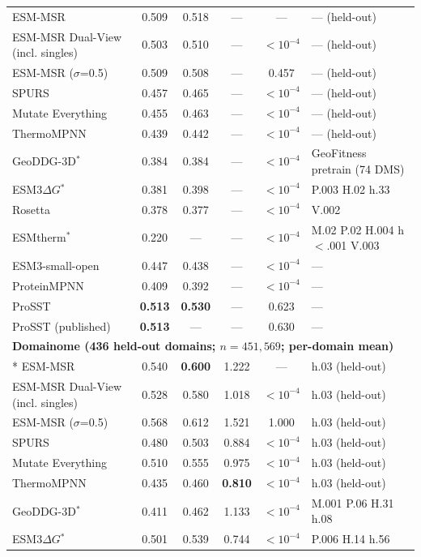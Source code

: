 {\begin{longtable}{lccccl}
\midrule
ESM-MSR & 0.509 & 0.518 & --- & --- & --- (held-out) \\
ESM-MSR Dual-View (incl. singles) & 0.503 & 0.510 & --- & $<10^{-4}$ & --- (held-out) \\
ESM-MSR ($\sigma$=0.5) & 0.509 & 0.508 & --- & 0.457 & --- (held-out) \\
SPURS & 0.457 & 0.465 & --- & $<10^{-4}$ & --- (held-out) \\
Mutate Everything & 0.455 & 0.463 & --- & $<10^{-4}$ & --- (held-out) \\
ThermoMPNN & 0.439 & 0.442 & --- & $<10^{-4}$ & --- (held-out) \\
GeoDDG-3D$^*$ & 0.384 & 0.384 & --- & $<10^{-4}$ & GeoFitness pretrain (74 DMS) \\
ESM3$\Delta G$$^*$ & 0.381 & 0.398 & --- & $<10^{-4}$ & P.003 H.02 h.33 \\
Rosetta & 0.378 & 0.377 & --- & $<10^{-4}$ & V.002 \\
ESMtherm$^*$ & 0.220 & --- & --- & $<10^{-4}$ & M.02 P.02 H.004 h$<$.001 V.003 \\
ESM3-small-open & 0.447 & 0.438 & --- & $<10^{-4}$ & --- \\
ProteinMPNN & 0.409 & 0.392 & --- & $<10^{-4}$ & --- \\
ProSST & \textbf{0.513} & \textbf{0.530} & --- & 0.623 & --- \\
ProSST (published) & \textbf{0.513} & --- & --- & 0.630 & --- \\
\midrule
\multicolumn{6}{l}{\textbf{Domainome (436 held-out domains; $n=451{,}569$; per-domain mean)}} \\*
\midrule
ESM-MSR & 0.540 & \textbf{0.600} & 1.222 & --- & h.03 (held-out) \\
ESM-MSR Dual-View (incl. singles) & 0.528 & 0.580 & 1.018 & $<10^{-4}$ & h.03 (held-out) \\
ESM-MSR ($\sigma$=0.5) & 0.568 & 0.612 & 1.521 & 1.000 & h.03 (held-out) \\
SPURS & 0.480 & 0.503 & 0.884 & $<10^{-4}$ & h.03 (held-out) \\
Mutate Everything & 0.510 & 0.555 & 0.975 & $<10^{-4}$ & h.03 (held-out) \\
ThermoMPNN & 0.435 & 0.460 & \textbf{0.810} & $<10^{-4}$ & h.03 (held-out) \\
GeoDDG-3D$^*$ & 0.411 & 0.462 & 1.133 & $<10^{-4}$ & M.001 P.06 H.31 h.08 \\
ESM3$\Delta G$$^*$ & 0.501 & 0.539 & 0.744 & $<10^{-4}$ & P.006 H.14 h.56 \\

\end{longtable}}
